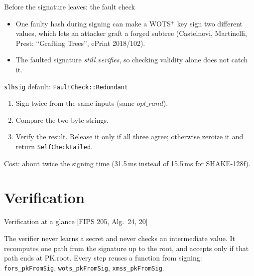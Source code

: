 \documentclass[aspectratio=169,11pt]{beamer}
\newcommand{\pk}[1]{\textcolor{pub}{#1}}
\newcommand{\alg}[1]{\textcolor{quiet}{\footnotesize[FIPS 205, Alg.~#1]}}
\begin{document}
\begin{frame}{Before the signature leaves: the fault check}
  \begin{itemize}
    \item One faulty hash during signing can make a WOTS$^+$ key sign two different values, which lets an attacker graft a forged subtree (Castelnovi, Martinelli, Prest: ``Grafting Trees'', ePrint 2018/102).
    \item The faulted signature \emph{still verifies}, so checking validity alone does not catch it.
  \end{itemize}
  \vspace{2mm}
  \begin{block}{\texttt{slhsig} default: \texttt{FaultCheck::Redundant}}
    \begin{enumerate}
      \item Sign twice from the same inputs (same $\mathit{opt\_rand}$).
      \item Compare the two byte strings.
      \item Verify the result. Release it only if all three agree; otherwise zeroize it and return \texttt{SelfCheckFailed}.
    \end{enumerate}
    Cost: about twice the signing time (31.5\,ms instead of 15.5\,ms for SHAKE-128f).
  \end{block}
\end{frame}

\section{Verification}

\begin{frame}{Verification at a glance \alg{24, 20}}
  \centering
  \vspace{4mm}

  \small
  The verifier never learns a secret and never checks an intermediate value. It recomputes one path from the signature up to the root, and accepts only if that path ends at \pk{PK.root}.
  Every step reuses a function from signing: \texttt{fors\_pkFromSig}, \texttt{wots\_pkFromSig}, \texttt{xmss\_pkFromSig}.
\end{frame}
\end{document}

